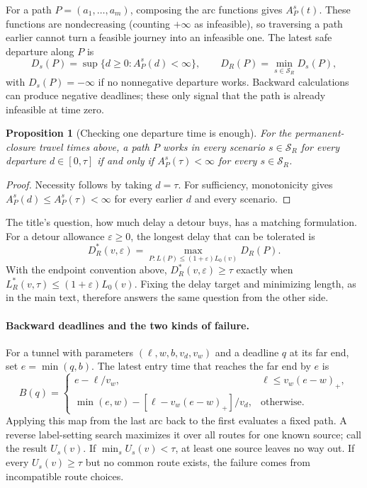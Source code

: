 \documentclass[11pt,a4paper]{article}
\newtheorem{proposition}{Proposition}
\newcommand{\Sc}{\mathcal{S}}
\begin{document}
For a path $P=(a_1,\ldots,a_m)$, composing the arc functions gives $A_P^s(t)$. These functions are nondecreasing (counting $+\infty$ as infeasible), so traversing a path earlier cannot turn a feasible journey into an infeasible one. The latest safe departure along $P$ is
\[
 D_s(P)=\sup\{d\ge0:A_P^s(d)<\infty\},\qquad
 D_R(P)=\min_{s\in\Sc_R}D_s(P),
\]
with $D_s(P)=-\infty$ if no nonnegative departure works. Backward calculations can produce negative deadlines; these only signal that the path is already infeasible at time zero.

\begin{proposition}[Checking one departure time is enough]
For the permanent-closure travel times above, a path $P$ works in every scenario $s\in\Sc_R$ for every departure $d\in[0,\tau]$ if and only if $A_P^s(\tau)<\infty$ for every $s\in\Sc_R$.
\end{proposition}
\begin{proof}
Necessity follows by taking $d=\tau$. For sufficiency, monotonicity gives $A_P^s(d)\le A_P^s(\tau)<\infty$ for every earlier $d$ and every scenario.
\end{proof}

The title's question, how much delay a detour buys, has a matching formulation. For a detour allowance $\varepsilon\ge0$, the longest delay that can be tolerated is
\[
 D_R^*(v,\varepsilon)=\max_{P:L(P)\le(1+\varepsilon)L_0(v)}D_R(P).
\]
With the endpoint convention above, $D_R^*(v,\varepsilon)\ge\tau$ exactly when $L_R^*(v,\tau)\le(1+\varepsilon)L_0(v)$. Fixing the delay target and minimizing length, as in the main text, therefore answers the same question from the other side.

\paragraph{Backward deadlines and the two kinds of failure.}
For a tunnel with parameters $(\ell,w,b,v_d,v_w)$ and a deadline $q$ at its far end, set $e=\min(q,b)$. The latest entry time that reaches the far end by $e$ is
\[
 B(q)=\begin{cases}
 e-\ell/v_w,&\ell\le v_w(e-w)_+,\\
 \min(e,w)-[\ell-v_w(e-w)_+]/v_d,&\text{otherwise}.
 \end{cases}
\]
Applying this map from the last arc back to the first evaluates a fixed path. A reverse label-setting search maximizes it over all routes for one known source; call the result $U_s(v)$. If $\min_s U_s(v)<\tau$, at least one source leaves no way out. If every $U_s(v)\ge\tau$ but no common route exists, the failure comes from incompatible route choices.
\end{document}
